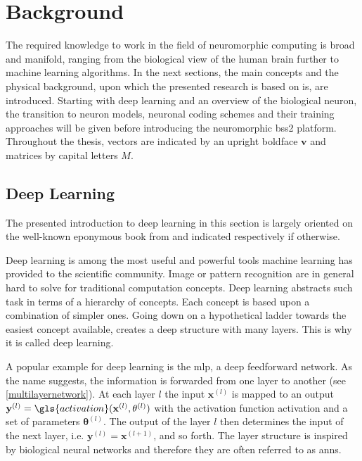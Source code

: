 
\chapter{Background}
The required knowledge to work in the field of neuromorphic computing is broad and manifold, ranging from the biological view of the human brain further to machine learning algorithms. In the next sections, the main concepts and the physical background, upon which the presented research is based on is, are introduced. Starting with deep learning and an overview of the biological neuron, the transition to neuron models, neuronal coding schemes and their training approaches will be given before introducing the neuromorphic \gls{bss2} platform. Throughout the thesis, vectors are indicated by an upright boldface $\mathbf{v}$ and matrices by capital letters $M$.
\section{Deep Learning}
\label{deeplearning}
The presented introduction to deep learning in this section is largely oriented on the well-known eponymous book from \cite{Goodfellow-et-al-2016} and indicated respectively if otherwise.

Deep learning is among the most useful and powerful tools machine learning has provided to the scientific community. Image or pattern recognition are in general hard to solve for traditional computation concepts. Deep learning abstracts such task in terms of a hierarchy of concepts. Each concept is based upon a combination of simpler ones. Going down on a hypothetical ladder towards the easiest concept available, creates a deep structure with many layers. This is why it is called deep learning.

A popular example for deep learning is the \gls{mlp}, a deep feedforward network. As the name suggests, the information is forwarded from one layer to another (see \cref{multilayernetwork}). At each layer $l$ the input $\mathbf{x}^{(l)}$ is mapped to an output $\mathbf{y}^{(l)} = \gls{activation}(\mathbf{x}^{(l)}, \mathbf{\theta}^{(l)})$ with the activation function \gls{activation} and a set of parameters $\mathbf{\theta}^{(l)}$. The output of the layer $l$ then determines the input of the next layer, i.e. $\mathbf{y}^{(l)} = \mathbf{x}^{(l+1)}$, and so forth. The layer structure is inspired by biological neural networks and therefore they are often referred to as \glspl{ann}. 

